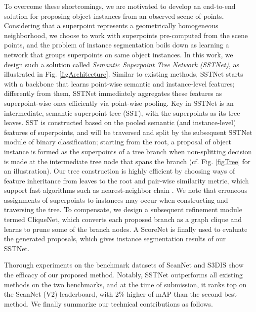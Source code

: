 \documentclass[10pt,twocolumn,letterpaper]{article}
\begin{document}
To overcome these shortcomings, we are motivated to develop an end-to-end solution for proposing object instances from an observed scene of points. Considering that a superpoint represents a geometrically homogeneous neighborhood, we choose to work with superpoints pre-computed from the scene points, and the problem of instance segmentation boils down as learning a network that groups superpoints on same object instances. In this work, we design such a solution called \emph{Semantic Superpoint Tree Network (SSTNet)}, as illustrated in Fig. \ref{figArchitecture}. Similar to existing methods, SSTNet starts with a backbone that learns point-wise semantic and instance-level features; differently from them, SSTNet immediately aggregates these features as superpoint-wise ones efficiently via point-wise pooling. Key in SSTNet is an intermediate, semantic superpoint tree (SST), with the superpoints as its tree leaves. SST is constructed based on the pooled semantic (and instance-level) features of superpoints, and will be traversed and split by the subsequent SSTNet module of binary classification; starting from the root, a proposal of object instance is formed as the superpoints of a tree branch when non-splitting decision is made at the intermediate tree node that spans the branch (cf. Fig. \ref{figTree} for an illustration). Our tree construction is highly efficient by choosing ways of feature inheritance from leaves to the root and pair-wise similarity metric, which support fast algorithms such as nearest-neighbor chain \cite{willett1987multidimensional}. We note that erroneous assignments of superpoints to instances may occur when constructing and traversing the tree. To compensate, we design a subsequent refinement module termed CliqueNet, which converts each proposed branch as a graph clique and learns to prune some of the branch nodes. A ScoreNet \cite{jiang2020pointgroup} is finally used to evaluate the generated proposals, which gives instance segmentation results of our SSTNet. 

Thorough experiments on the benchmark datasets of ScanNet \cite{dai2017scannet} and S3DIS\cite{armeni20163d} show the efficacy of our proposed method. Notably, SSTNet outperforms all existing methods on the two benchmarks, and at the time of submission, it ranks top on the ScanNet (V2) leaderboard, with 2\% higher of mAP than the second best method. We finally summarize our technical contributions as follows.
\end{document}
